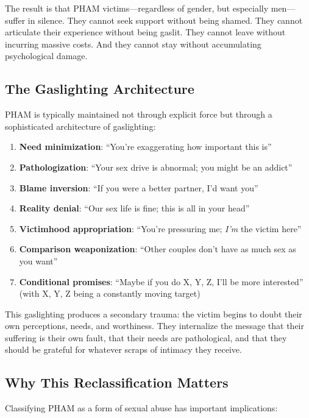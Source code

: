 \documentclass[12pt,openany]{book}
\numberwithin{equation}{chapter}
\begin{document}
The result is that PHAM victims---regardless of gender, but especially men---suffer in silence. They cannot seek support without being shamed. They cannot articulate their experience without being gaslit. They cannot leave without incurring massive costs. And they cannot stay without accumulating psychological damage.

\subsection{The Gaslighting Architecture}

PHAM is typically maintained not through explicit force but through a sophisticated architecture of gaslighting:

\begin{enumerate}
    \item \textbf{Need minimization}: ``You're exaggerating how important this is''
    \item \textbf{Pathologization}: ``Your sex drive is abnormal; you might be an addict''
    \item \textbf{Blame inversion}: ``If you were a better partner, I'd want you''
    \item \textbf{Reality denial}: ``Our sex life is fine; this is all in your head''
    \item \textbf{Victimhood appropriation}: ``You're pressuring me; \textit{I'm} the victim here''
    \item \textbf{Comparison weaponization}: ``Other couples don't have as much sex as you want''
    \item \textbf{Conditional promises}: ``Maybe if you do X, Y, Z, I'll be more interested'' (with X, Y, Z being a constantly moving target)
\end{enumerate}

This gaslighting produces a secondary trauma: the victim begins to doubt their own perceptions, needs, and worthiness. They internalize the message that their suffering is their own fault, that their needs are pathological, and that they should be grateful for whatever scraps of intimacy they receive.

\subsection{Why This Reclassification Matters}

Classifying PHAM as a form of sexual abuse has important implications:
\end{document}
